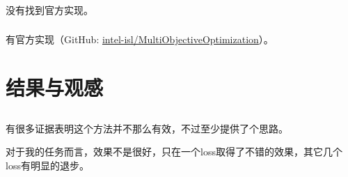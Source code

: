 \documentclass{ctexart}
\begin{document}
\subsubsection{}

没有找到官方实现。

\subsubsection{}

有官方实现（GitHub: \href{https://github.com/intel-isl/MultiObjectiveOptimization}{intel-isl/MultiObjectiveOptimization}）。

\section{结果与观感}

\subsection{}

有很多证据表明这个方法并不那么有效，不过至少提供了个思路。

对于我的任务而言，效果不是很好，只在一个loss取得了不错的效果，其它几个loss有明显的退步。

\subsection{}

\subsection{}


\end{document}
